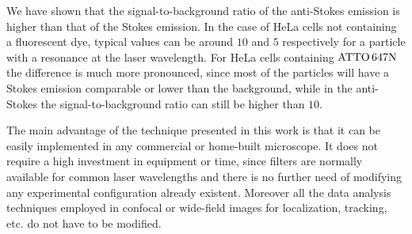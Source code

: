 We have shown that the signal-to-background ratio of the anti-Stokes emission is
higher than that of the Stokes emission. In the case of HeLa cells not
containing a fluorescent dye, typical values can be around $10$ and $5$
respectively for a particle with a resonance at the laser wavelength. For HeLa
cells containing $\textrm{ATTO}\,647\textrm{N}$ the difference is much more pronounced, since most of
the particles will have a Stokes emission comparable or lower than the
background, while in the anti-Stokes the signal-to-background ratio can still be
higher than $10$.

The main advantage of the technique presented in this work is that it can be
easily implemented in any commercial or home-built microscope. It does not
require a high investment in equipment or time, since filters are normally
available for common laser wavelengths and there is no further need of modifying
any experimental configuration already existent. Moreover all the data analysis
techniques employed in confocal or wide-field images for localization, tracking,
etc. do not have to be modified.


